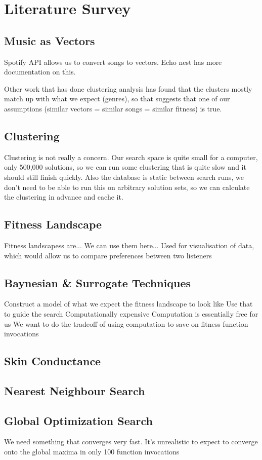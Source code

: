 \documentclass{article}
\begin{document}
	\section{Literature Survey}
	
	\subsection{Music as Vectors}
	Spotify API allows us to convert songs to vectors. Echo nest has more documentation on this.
	
	Other work that has done clustering analysis has found that the clusters mostly match up with what we expect (genres), so that suggests that one of our assumptions (similar vectors = similar songs = similar fitness) is true.
	
	\subsection{Clustering}
	Clustering is not really a concern. Our search space is quite small for a computer, only 500,000 solutions, so we can run some clustering that is quite slow and it should still finish quickly. Also the database is static between search runs, we don't need to be able to run this on arbitrary solution sets, so we can calculate the clustering in advance and cache it.
	
	\subsection{Fitness Landscape}
	Fitness landscapess are...
	We can use them here...
	Used for visualisation of data, which would allow us to compare preferences between two listeners
	
	\subsection{Baynesian \& Surrogate Techniques}
	Construct a model of what we expect the fitness landscape to look like
	Use that to guide the search
	Computationally expensive
	Computation is essentially free for us
	We want to do the tradeoff of using computation to save on fitness function invocations
	
	\subsection{Skin Conductance}
	
	\subsection{Nearest Neighbour Search}
	
	\subsection{Global Optimization Search}
	We need something that converges very fast.
	It's unrealistic to expect to converge onto the global maxima in only 100 function invocations
	
	
	
\end{document}
